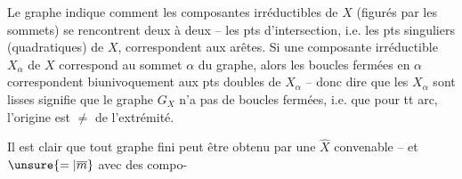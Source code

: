 Le graphe indique comment les composantes irréductibles de $X$ (figurés par les sommets) se rencontrent deux à deux -- les pts d'intersection, i.e. les pts singuliers (quadratiques) de $X$, correspondent aux arêtes. Si une composante irréductible $X_\alpha$ de $X$ correspond au sommet $\alpha$ du graphe, alors les boucles fermées en $\alpha$ correspondent biunivoquement aux pts doubles de $X_\alpha$ -- donc dire que les $X_\alpha$ sont lisses signifie que le graphe $G_X$ n'a pas de boucles fermées, i.e. que pour tt arc, l'origine est $\neq$ de l'extrémité.

Il est clair que tout graphe fini peut être obtenu   par une $\widehat X$ convenable -- et $\unsure{=|\overline m}$ avec des compo-
